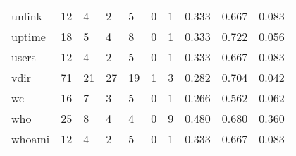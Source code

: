 \begin{longtable}{lp{2.0cm}p{2.0cm}p{2.0cm}p{2.0cm}p{2.0cm}p{2.0cm}p{2.0cm}p{2.0cm}p{2.0cm}}
unlink    &                     12 &                                             4 &                                            2 &                                           5 &                                            0 &                                          1 &                                0.333 &                                  0.667 &                                0.083 \\
uptime    &                     18 &                                             5 &                                            4 &                                           8 &                                            0 &                                          1 &                                0.333 &                                  0.722 &                                0.056 \\
users     &                     12 &                                             4 &                                            2 &                                           5 &                                            0 &                                          1 &                                0.333 &                                  0.667 &                                0.083 \\
vdir      &                     71 &                                            21 &                                           27 &                                          19 &                                            1 &                                          3 &                                0.282 &                                  0.704 &                                0.042 \\
wc        &                     16 &                                             7 &                                            3 &                                           5 &                                            0 &                                          1 &                                0.266 &                                  0.562 &                                0.062 \\
who       &                     25 &                                             8 &                                            4 &                                           4 &                                            0 &                                          9 &                                0.480 &                                  0.680 &                                0.360 \\
whoami    &                     12 &                                             4 &                                            2 &                                           5 &                                            0 &                                          1 &                                0.333 &                                  0.667 &                                0.083 \\

\end{longtable}
